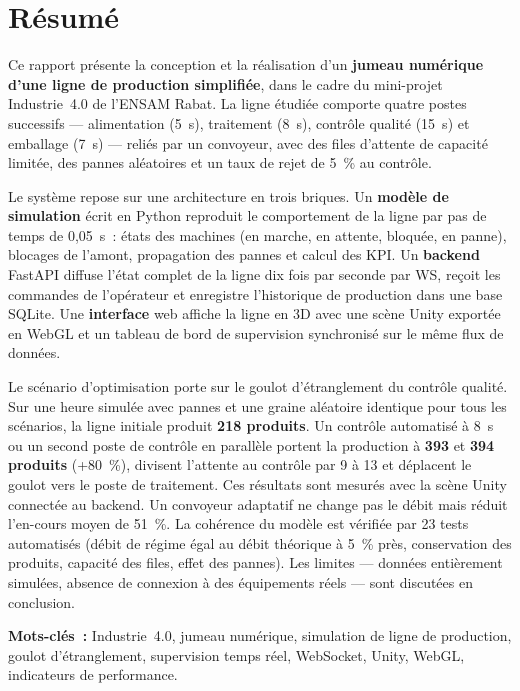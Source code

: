 \chapter*{Résumé}
\thispagestyle{plain}

Ce rapport présente la conception et la réalisation d'un \textbf{jumeau numérique d'une ligne de production simplifiée}, dans le cadre du mini-projet Industrie~4.0 de l'\ac{ENSAM} Rabat. La ligne étudiée comporte quatre postes successifs --- alimentation (5~s), traitement (8~s), contrôle qualité (15~s) et emballage (7~s) --- reliés par un convoyeur, avec des files d'attente de capacité limitée, des pannes aléatoires et un taux de rejet de 5~\% au contrôle.

Le système repose sur une architecture en trois briques. Un \textbf{modèle de simulation} écrit en Python reproduit le comportement de la ligne par pas de temps de 0{,}05~s~: états des machines (en marche, en attente, bloquée, en panne), blocages de l'amont, propagation des pannes et calcul des \ac{KPI}. Un \textbf{backend} FastAPI diffuse l'état complet de la ligne dix fois par seconde par \ac{WS}, reçoit les commandes de l'opérateur et enregistre l'historique de production dans une base SQLite. Une \textbf{interface} web affiche la ligne en \ac{3D} avec une scène Unity exportée en WebGL et un tableau de bord de supervision synchronisé sur le même flux de données.

Le scénario d'optimisation porte sur le goulot d'étranglement du contrôle qualité. Sur une heure simulée avec pannes et une graine aléatoire identique pour tous les scénarios, la ligne initiale produit \textbf{218 produits}. Un contrôle automatisé à 8~s ou un second poste de contrôle en parallèle portent la production à \textbf{393} et \textbf{394 produits} (+80~\%), divisent l'attente au contrôle par 9 à 13 et déplacent le goulot vers le poste de traitement. Ces résultats sont mesurés avec la scène Unity connectée au backend. Un convoyeur adaptatif ne change pas le débit mais réduit l'en-cours moyen de 51~\%. La cohérence du modèle est vérifiée par 23 tests automatisés (débit de régime égal au débit théorique à 5~\% près, conservation des produits, capacité des files, effet des pannes). Les limites --- données entièrement simulées, absence de connexion à des équipements réels --- sont discutées en conclusion.

\vspace{0.4cm}
\textbf{Mots-clés~:} Industrie~4.0, jumeau numérique, simulation de ligne de production, goulot d'étranglement, supervision temps réel, WebSocket, Unity, WebGL, indicateurs de performance.

